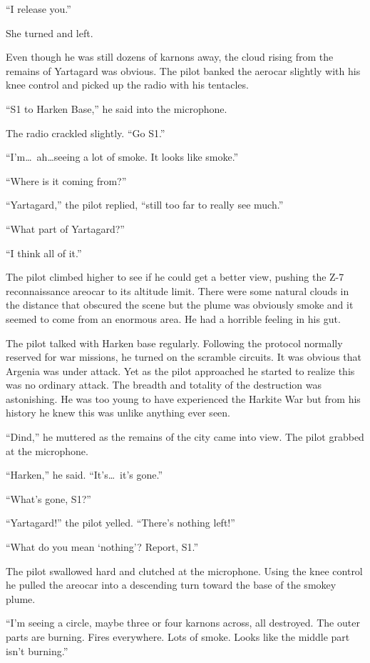 ``I release you.''

She turned and left.

\spacebreak

Even though he was still dozens of karnons away, the cloud rising from the remains of Yartagard
was obvious. The pilot banked the aerocar slightly with his knee control and picked up the radio
with his tentacles.

``S1 to Harken Base,'' he said into the microphone.

The radio crackled slightly. ``Go S1.''

``I'm\ldots\ ah\ldots seeing a lot of smoke. It looks like smoke.''

``Where is it coming from?''

``Yartagard,'' the pilot replied, ``still too far to really see much.''

``What part of Yartagard?''

``I think all of it.''

The pilot climbed higher to see if he could get a better view, pushing the Z-7 reconnaissance
areocar to its altitude limit. There were some natural clouds in the distance that obscured the
scene but the plume was obviously smoke and it seemed to come from an enormous area. He had a
horrible feeling in his gut.

The pilot talked with Harken base regularly. Following the protocol normally reserved for war
missions, he turned on the scramble circuits. It was obvious that Argenia was under attack. Yet
as the pilot approached he started to realize this was no ordinary attack. The breadth and
totality of the destruction was astonishing. He was too young to have experienced the Harkite
War but from his history he knew this was unlike anything ever seen.

``Dind,'' he muttered as the remains of the city came into view. The pilot grabbed at the
microphone.

``Harken,'' he said. ``It's\ldots\ it's gone.''

``What's gone, S1?''

``Yartagard!'' the pilot yelled. ``There's nothing left!''

``What do you mean `nothing'? Report, S1.''

The pilot swallowed hard and clutched at the microphone. Using the knee control he pulled the
areocar into a descending turn toward the base of the smokey plume.

``I'm seeing a circle, maybe three or four karnons across, all destroyed. The outer parts are
burning. Fires everywhere. Lots of smoke. Looks like the middle part isn't burning.''

